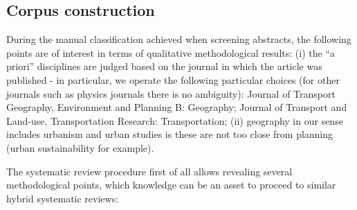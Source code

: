 \documentclass[10pt]{article}
\begin{document}
\subsection{Corpus construction}

During the manual classification achieved when screening abstracts, the following points are of interest in terms of qualitative methodological results: (i) the ``a priori'' disciplines are judged based on the journal in which the article was published - in particular, we operate the following particular choices (for other journals such as physics journals there is no ambiguity): Journal of Transport Geography, Environment and Planning B: Geography; Journal of Transport and Land-use, Transportation Research: Transportation; (ii) geography in our sense includes urbanism and urban studies is these are not too close from planning (urban sustainability for example).

The systematic review procedure first of all allows revealing several methodological points, which knowledge can be an asset to proceed to similar hybrid systematic reviews:
\end{document}
